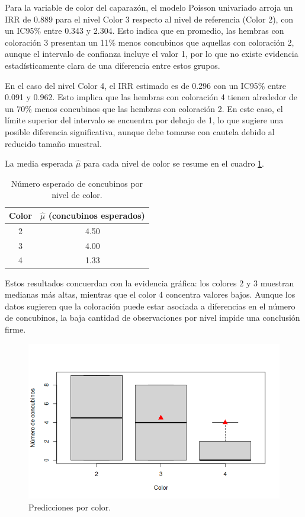 Para la variable de color del caparazón, el modelo Poisson univariado arroja un IRR de 0.889 para el nivel
Color 3 respecto al nivel de referencia (Color 2), con un IC95\% entre 0.343 y 2.304. Esto indica que en
promedio, las hembras con coloración 3 presentan un 11\% menos concubinos que aquellas con coloración 2,
aunque el intervalo de confianza incluye el valor 1, por lo que no existe evidencia estadísticamente clara
de una diferencia entre estos grupos.

En el caso del nivel Color 4, el IRR estimado es de 0.296 con un IC95\% entre 0.091 y 0.962. Esto implica
que las hembras con coloración 4 tienen alrededor de un 70\% menos concubinos que las hembras con coloración 2.
En este caso, el límite superior del intervalo se encuentra por debajo de 1, lo que sugiere una posible
diferencia significativa, aunque debe tomarse con cautela debido al reducido tamaño muestral.

La media esperada $\hat{\mu}$ para cada nivel de color se resume en el cuadro \ref{tab:color-concubinos}.

\begin{table}[h!]
    \centering
    \begin{tabular}{|c|c|}
        \hline
        \textbf{Color} & \textbf{$\hat{\mu}$ (concubinos esperados)} \\
        \hline
        2 & 4.50 \\
        \hline
        3 & 4.00 \\
        \hline
        4 & 1.33 \\
        \hline
    \end{tabular}
    \caption{Número esperado de concubinos por nivel de color.}
    \label{tab:color-concubinos}
\end{table}

Estos resultados concuerdan con la evidencia gráfica: los colores 2 y 3 muestran medianas más altas, mientras
que el color 4 concentra valores bajos. Aunque los datos sugieren que la coloración puede estar asociada a
diferencias en el número de concubinos, la baja cantidad de observaciones por nivel impide una conclusión
firme.

\begin{figure}[h!]
    \centering
    \includegraphics[width=0.7\linewidth]{Images/color-capa.png}
    \caption{Predicciones por color.}
    \label{fig:color-capa}
\end{figure}

